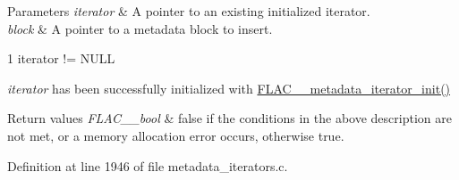 \begin{DoxyParams}{Parameters}
{\em iterator} & A pointer to an existing initialized iterator. \\
\hline
{\em block} & A pointer to a metadata block to insert.  
\begin{DoxyCode}
1 iterator != NULL 
\end{DoxyCode}
 {\itshape iterator} has been successfully initialized with \hyperlink{group__flac__metadata__level2_ga4a5af69a1f19436b02f738eb8c97c959}{F\+L\+A\+C\+\_\+\+\_\+metadata\+\_\+iterator\+\_\+init()} \\
\hline
\end{DoxyParams}

\begin{DoxyRetVals}{Return values}
{\em F\+L\+A\+C\+\_\+\+\_\+bool} & {\ttfamily false} if the conditions in the above description are not met, or a memory allocation error occurs, otherwise {\ttfamily true}. \\
\hline
\end{DoxyRetVals}


Definition at line 1946 of file metadata\+\_\+iterators.\+c.

